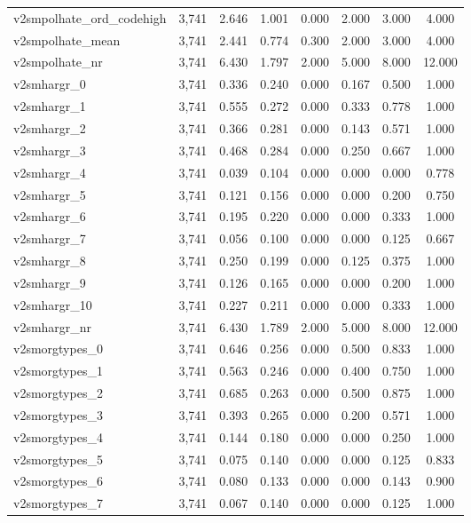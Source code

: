 \begin{table}[!htbp]
\begin{tabular}{@{\extracolsep{5pt}}lccccccc}
v2smpolhate\_ord\_codehigh & 3,741 & 2.646 & 1.001 & 0.000 & 2.000 & 3.000 & 4.000 \\ 
v2smpolhate\_mean & 3,741 & 2.441 & 0.774 & 0.300 & 2.000 & 3.000 & 4.000 \\ 
v2smpolhate\_nr & 3,741 & 6.430 & 1.797 & 2.000 & 5.000 & 8.000 & 12.000 \\ 
v2smhargr\_0 & 3,741 & 0.336 & 0.240 & 0.000 & 0.167 & 0.500 & 1.000 \\ 
v2smhargr\_1 & 3,741 & 0.555 & 0.272 & 0.000 & 0.333 & 0.778 & 1.000 \\ 
v2smhargr\_2 & 3,741 & 0.366 & 0.281 & 0.000 & 0.143 & 0.571 & 1.000 \\ 
v2smhargr\_3 & 3,741 & 0.468 & 0.284 & 0.000 & 0.250 & 0.667 & 1.000 \\ 
v2smhargr\_4 & 3,741 & 0.039 & 0.104 & 0.000 & 0.000 & 0.000 & 0.778 \\ 
v2smhargr\_5 & 3,741 & 0.121 & 0.156 & 0.000 & 0.000 & 0.200 & 0.750 \\ 
v2smhargr\_6 & 3,741 & 0.195 & 0.220 & 0.000 & 0.000 & 0.333 & 1.000 \\ 
v2smhargr\_7 & 3,741 & 0.056 & 0.100 & 0.000 & 0.000 & 0.125 & 0.667 \\ 
v2smhargr\_8 & 3,741 & 0.250 & 0.199 & 0.000 & 0.125 & 0.375 & 1.000 \\ 
v2smhargr\_9 & 3,741 & 0.126 & 0.165 & 0.000 & 0.000 & 0.200 & 1.000 \\ 
v2smhargr\_10 & 3,741 & 0.227 & 0.211 & 0.000 & 0.000 & 0.333 & 1.000 \\ 
v2smhargr\_nr & 3,741 & 6.430 & 1.789 & 2.000 & 5.000 & 8.000 & 12.000 \\ 
v2smorgtypes\_0 & 3,741 & 0.646 & 0.256 & 0.000 & 0.500 & 0.833 & 1.000 \\ 
v2smorgtypes\_1 & 3,741 & 0.563 & 0.246 & 0.000 & 0.400 & 0.750 & 1.000 \\ 
v2smorgtypes\_2 & 3,741 & 0.685 & 0.263 & 0.000 & 0.500 & 0.875 & 1.000 \\ 
v2smorgtypes\_3 & 3,741 & 0.393 & 0.265 & 0.000 & 0.200 & 0.571 & 1.000 \\ 
v2smorgtypes\_4 & 3,741 & 0.144 & 0.180 & 0.000 & 0.000 & 0.250 & 1.000 \\ 
v2smorgtypes\_5 & 3,741 & 0.075 & 0.140 & 0.000 & 0.000 & 0.125 & 0.833 \\ 
v2smorgtypes\_6 & 3,741 & 0.080 & 0.133 & 0.000 & 0.000 & 0.143 & 0.900 \\ 
v2smorgtypes\_7 & 3,741 & 0.067 & 0.140 & 0.000 & 0.000 & 0.125 & 1.000 \\ 

\end{tabular}
\end{table}
